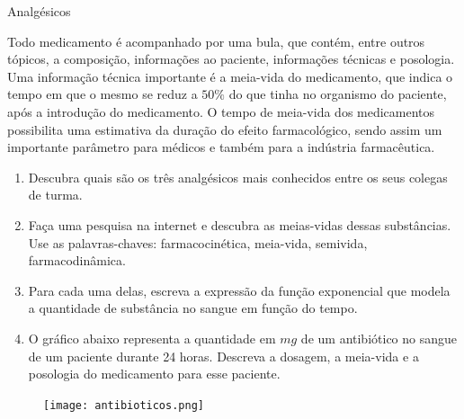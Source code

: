 \begin{task}{Analgésicos}

Todo medicamento é acompanhado por uma bula, que contém, entre outros tópicos, a composição, informações ao paciente, informações técnicas e posologia. Uma informação técnica importante é a meia-vida do medicamento, que indica o tempo em que o mesmo se reduz a $50\%$ do que tinha no organismo do paciente, após a introdução do medicamento. O tempo de meia-vida dos medicamentos possibilita uma estimativa da duração do efeito farmacológico, sendo assim um importante parâmetro para médicos e também para a indústria farmacêutica.

\begin{enumerate}

\item{} Descubra quais são os três analgésicos mais conhecidos entre os seus colegas de turma.

\item {} Faça uma pesquisa na internet e descubra as meias-vidas dessas substâncias. Use as palavras-chaves: farmacocinética, meia-vida, semivida, farmacodinâmica.

\item {} Para cada uma delas, escreva a expressão da função exponencial que modela a quantidade de substância no sangue em função do tempo.

\item{} O gráfico abaixo representa a quantidade em $mg$ de um antibiótico no sangue de um paciente durante 24 horas. Descreva a dosagem, a meia-vida e a posologia do medicamento para esse paciente.

\end{enumerate}

\begin{figure}[H]
\centering
\texttt{[image: antibioticos.png]}
\end{figure}

\end{task}





